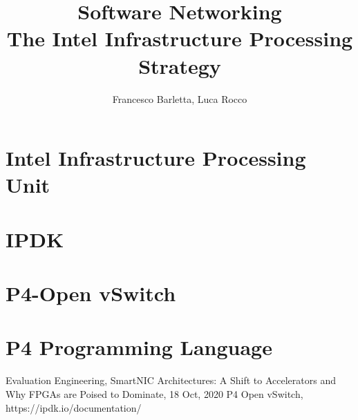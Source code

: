 \documentclass{article}
\title{
    Software Networking \\
    \large The Intel Infrastructure Processing Strategy}
\begin{document}
\author{Francesco Barletta, Luca Rocco}

\maketitle

\section{Intel\raisebox {1mm}{\textregistered} Infrastructure Processing Unit}


\section{IPDK}


\section{P4-Open vSwitch}


\section{P4 Programming Language}


\begin{thebibliography}{1}
    Evaluation Engineering, SmartNIC Architectures: A Shift to Accelerators and Why FPGAs are Poised to Dominate, 18 Oct, 2020
    P4 Open vSwitch, https://ipdk.io/documentation/
\end{thebibliography}
\end{document}
